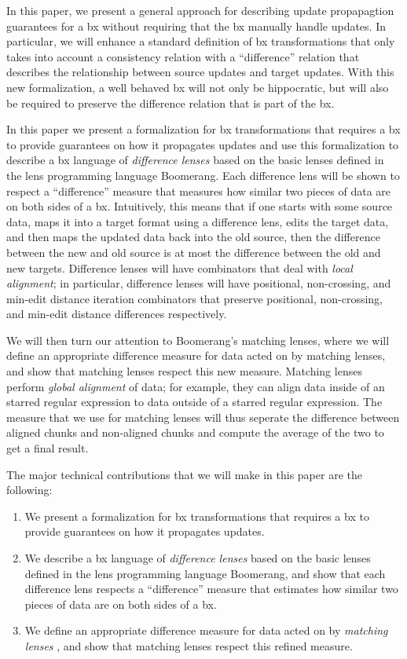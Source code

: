 \documentclass[acmsmall,review,anonymous]{acmart}\settopmatter{printfolios=true,printccs=false,printacmref=false}
\theoremstyle{definition}
\begin{document}
In this paper, we present a general approach for describing update propapagtion guarantees for a bx without requiring that the bx manually handle updates. In particular, we will enhance a standard definition of bx transformations that only takes into account a consistency relation with a ``difference'' relation that describes the relationship between source updates and target updates. With this new formalization, a well behaved bx will not only be hippocratic, but will also be required to preserve the difference relation that is part of the bx.

In this paper we present a formalization for bx transformations that requires a bx to provide guarantees on how it propagates updates and use this formalization to describe a bx language of {\em difference lenses} based on the basic lenses defined in the lens programming language Boomerang. Each difference lens will be shown to respect a ``difference'' measure that measures how similar two pieces of data are on both sides of a bx. Intuitively, this means that if one starts with some source data, maps it into a target format using a difference lens, edits the target data, and then maps the updated data back into the old source, then the difference between the new and old source is at most the difference between the old and new targets. Difference lenses will have combinators that deal with {\em local alignment}; in particular, difference lenses will have positional, non-crossing, and min-edit distance iteration combinators that preserve positional, non-crossing, and min-edit distance differences respectively. 

We will then turn our attention to Boomerang's matching lenses, where we will define an appropriate difference measure for data acted on by matching lenses, and show that matching lenses respect this new measure. Matching lenses perform {\em global alignment} of data; for example, they can align data inside of an starred regular expression to data outside of a starred regular expression. The measure that we use for matching lenses will thus seperate the difference between aligned chunks and non-aligned chunks and compute the average of the two to get a final result.

The major technical contributions that we will make in this paper are the following:
\begin{enumerate}
\item
We present a formalization for bx transformations that requires a bx to provide guarantees on how it propagates updates. 
\item
We describe a bx language of {\em difference lenses} based on the basic lenses defined in the lens programming language Boomerang, and show that each difference lens respects a ``difference'' measure that estimates how similar two pieces of data are on both sides of a bx.
  \item
We define an appropriate difference measure for data acted on by {\em matching lenses} \cite{barbosa2010matching}, and show that matching lenses respect this refined measure.
\end{enumerate}
\end{document}
